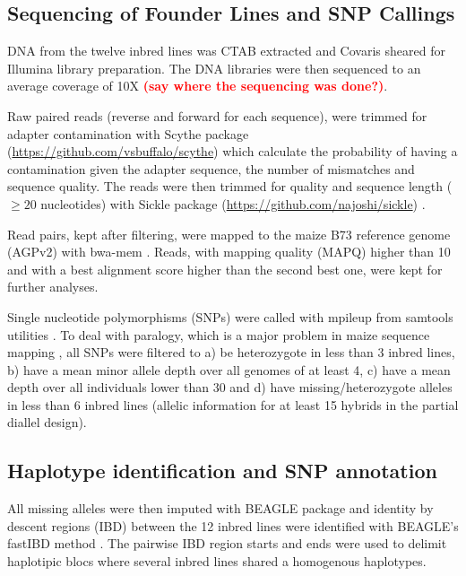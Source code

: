 \documentclass[9pt,twocolumn,twoside]{gsajnl}
\newcommand{\sme}[1]{\textcolor{red}{\bf #1}}
\begin{document}
\subsection*{Sequencing of Founder Lines and SNP Callings}

DNA from the twelve inbred lines was CTAB extracted \citep{Doyle1987} and Covaris sheared for Illumina library preparation. The DNA libraries were then sequenced to an average coverage of 10X \sme{(say where the sequencing was done?)}.

Raw paired reads (reverse and forward for each sequence), were trimmed for adapter contamination with Scythe package (\url{https://github.com/vsbuffalo/scythe}) which calculate the probability of having a contamination given the adapter sequence, the number of mismatches and sequence quality. The reads were then trimmed for quality and sequence length ($\geq 20$ nucleotides) with Sickle package (\url{https://github.com/najoshi/sickle}) .

Read pairs, kept after filtering,  were mapped to the maize B73 reference genome (AGPv2) with bwa-mem \citep{Li2009B}. Reads, with mapping quality (MAPQ) higher than 10 and with a best alignment score higher than the second best one, were kept for further analyses.

Single nucleotide polymorphisms (SNPs) were called with mpileup from samtools utilities \citep{Li2009}. To deal with paralogy, which is a major problem in maize sequence mapping \citep{Chia2012}, all SNPs were filtered to a) be heterozygote in less than 3 inbred lines, b) have a mean minor allele depth over all genomes of at least 4, c) have a mean depth over all individuals lower than 30 and d) have missing/heterozygote alleles in less than 6 inbred lines (allelic information for at least 15 hybrids in the partial diallel design). 



\subsection*{Haplotype identification and SNP annotation}

All missing alleles were then imputed with BEAGLE package \citep{Browning2009} and identity by descent regions (IBD) between the 12 inbred lines were identified with BEAGLE's fastIBD method \citep{Browning2011}. The pairwise IBD region starts and ends were used to delimit haplotipic blocs where several inbred lines shared a homogenous haplotypes.%
\end{document}
